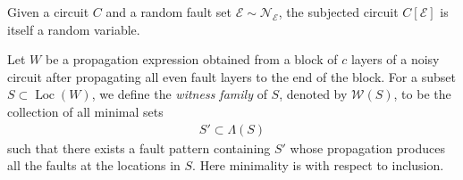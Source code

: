 Given a circuit $C$ and a random fault set $\mathcal{E}\sim\mathcal{N}_{\mathcal{E}}$, the subjected circuit $C[\mathcal{E}]$ is itself a random variable.

\begin{definition}
  Let $W$ be a propagation expression obtained from a block of $c$ layers of a noisy circuit after propagating all even fault layers to the end of the block. For a subset $S\subset \operatorname{Loc}(W)$, we define the \textit{witness family} of $S$, denoted by $\mathcal{W}(S)$, to be the collection of all minimal sets
  \begin{equation*}
    \begin{split}
      S'\subset \Lambda(S)
    \end{split}
  \end{equation*}
  such that there exists a fault pattern containing $S'$ whose propagation produces all the faults at the locations in $S$. Here minimality is with respect to inclusion.
\end{definition}

